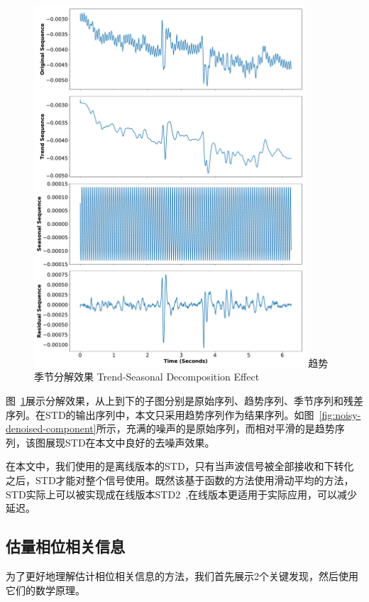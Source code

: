 \begin{figure}[!htp]
  \centering
  \includegraphics[width=0.9\textwidth]{figure/std-effect.pdf}
  \bicaption
    {趋势季节分解效果}
    {Trend-Seasonal Decomposition Effect}
  \label{fig:trend-seasonal-decomposition-effect}
\end{figure}
图~\ref{fig:trend-seasonal-decomposition-effect}展示分解效果，从上到下的子图分别是原始序列、趋势序列、季节序列和残差序列。在STD的输出序列中，本文只采用趋势序列作为结果序列。如图~\ref{fig:noisy-denoised-component}所示，充满的噪声的是原始序列，而相对平滑的是趋势序列，该图展现STD在本文中良好的去噪声效果。

在本文中，我们使用的是离线版本的STD，只有当声波信号被全部接收和下转化之后，STD才能对整个信号使用。既然该基于函数的方法使用滑动平均的方法，STD实际上可以被实现成在线版本STD2~\cite{std2},在线版本更适用于实际应用，可以减少延迟。

\subsection{估量相位相关信息}
为了更好地理解估计相位相关信息的方法，我们首先展示2个关键发现，然后使用它们的数学原理。

